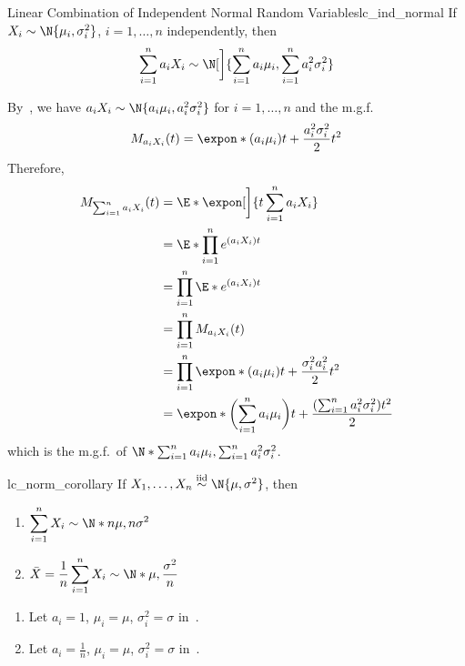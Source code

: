 \begin{Theorem}{Linear Combination of Independent Normal Random Variables}{lc_ind_normal}
    If $ X_i \sim \N{\mu_i,\sigma_i^2} $, $ i=1,\ldots,n $
    independently, then
    \[ \sum_{i=1}^{n} a_i X_i \sim \N[\bigg]{\sum_{i=1}^{n} a_i\mu_i,
            \sum_{i=1}^{n} a_i^2\sigma_i^2} \]
\end{Theorem}
\begin{Proof}{}{}
    By~, we have
    $ a_i X_i \sim \N{a_i\mu_i,a_i^2\sigma_i^2} $ for $ i=1,\ldots, n $
    and the m.g.f.\
    \[ M_{a_i X_i}(t)=\expon*{(a_i\mu_i)t+\frac{a_i^2\sigma_i^2}{2}t^2} \]
    Therefore,
    \begin{align*}
        M_{\sum_{i=1}^{n} a_i X_i}(t)
         & =\E*{\expon[\bigg]{t \sum_{i=1}^{n} a_i X_i}}                      \\
         & =\E*{\prod_{i=1}^n e^{(a_i X_i)t}}                                 \\
         & =\prod_{i=1}^n\E*{e^{(a_i X_i)t}}                                  \\
         & =\prod_{i=1}^n M_{a_i X_i}(t)                                      \\
         & =\prod_{i=1}^n \expon*{(a_i\mu_i)t+\frac{\sigma_i^2 a_i^2}{2}t^2 } \\
         & =\expon*{\biggl(\sum_{i=1}^{n} a_i\mu_i\biggr)t
            +\frac{(\sum_{i=1}^{n} a_i^2\sigma_i^2)t^2}{2}}
    \end{align*}
    which is the m.g.f.\ of
    $ \N*{\sum_{i=1}^{n} a_i\mu_i,\sum_{i=1}^{n} a_i^2\sigma_i^2} $.
\end{Proof}
\begin{Corollary}{}{lc_norm_corollary}
    If $ X_1,\ldots,X_n \stackrel{\text{iid}}{\sim} \N{\mu,\sigma^2} $,
    then
    \begin{enumerate}[label=(\arabic*)]
        \item $ \displaystyle  \sum_{i=1}^{n} X_i \sim \N*{n\mu,n\sigma^2} $
        \item $ \displaystyle \bar{X}=\frac{1}{n} \sum_{i=1}^{n} X_i \sim \N*{\mu,\frac{\sigma^2}{n}} $
    \end{enumerate}
\end{Corollary}
\begin{Proof}{}{}
    \begin{enumerate}[label=(\arabic*)]
        \item Let $ a_i=1 $, $ \mu_i=\mu $, $ \sigma_i^2=\sigma $ in~.
        \item Let $ a_i=\frac{1}{n} $, $ \mu_i=\mu $, $ \sigma_i^2=\sigma $ in~.
    \end{enumerate}
\end{Proof}
